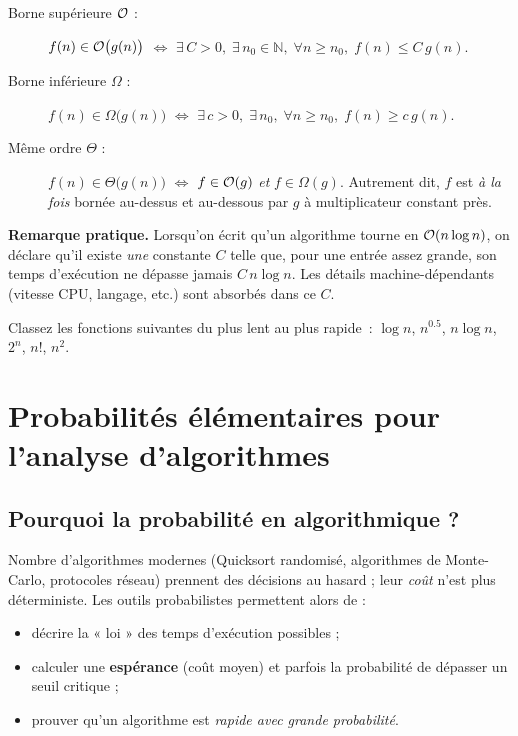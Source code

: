 \begin{description}
  \item[Borne supérieure $\mathcal{O}$ : ]
        \(f(n)\in\mathcal{O}\bigl(g(n)\bigr)\)
        \(\Longleftrightarrow\) \(\exists\,C>0,\;\exists\,n_{0}\in\mathbb N,\;
        \forall n\ge n_{0},\;f(n)\le C\,g(n).\)

  \item[Borne inférieure $\Omega$ : ]
        \(f(n)\in\Omega\bigl(g(n)\bigr)\)
        \(\Longleftrightarrow\) \(\exists\,c>0,\;\exists\,n_{0},\;
        \forall n\ge n_{0},\;f(n)\ge c\,g(n).\)

  \item[Même ordre $\Theta$ : ]
        \(f(n)\in\Theta\bigl(g(n)\bigr)\)
        \(\Longleftrightarrow\) \(f\in\mathcal{O}(g)\) \emph{et}
        \(f\in\Omega(g)\).
        Autrement dit, $f$ est \emph{à la fois} bornée au-dessus et au-dessous
        par $g$ à multiplicateur constant près.

\end{description}

\vspace{0.4em}
\noindent
\textbf{Remarque pratique.}  Lorsqu’on écrit qu’un algorithme tourne en
$\mathcal{O}(n\log n)$, on déclare qu’il existe \emph{une} constante $C$ telle que,
pour une entrée assez grande, son temps d’exécution ne dépasse jamais
$C\,n\log n$.  Les détails machine-dépendants (vitesse CPU, langage, etc.)
sont absorbés dans ce $C$.


\begin{exercice}
Classez les fonctions suivantes du plus lent au plus rapide :
$\log n$, $n^{0.5}$, $n\log n$, $2^{n}$, $n!$, $n^{2}$.
\end{exercice}



\section{Probabilités élémentaires pour l’analyse d’algorithmes}

\subsection{Pourquoi la probabilité en algorithmique ?}
Nombre d’algorithmes modernes (Quicksort randomisé, algorithmes de Monte-Carlo,
protocoles réseau) prennent des décisions au hasard ; leur \emph{coût} n’est
plus déterministe.  Les outils probabilistes permettent alors de :
\begin{itemize}
  \item décrire la « loi » des temps d’exécution possibles ;
  \item calculer une \textbf{espérance} (coût moyen) et parfois la probabilité
        de dépasser un seuil critique ;
  \item prouver qu’un algorithme est \emph{rapide avec grande probabilité}.
\end{itemize}


